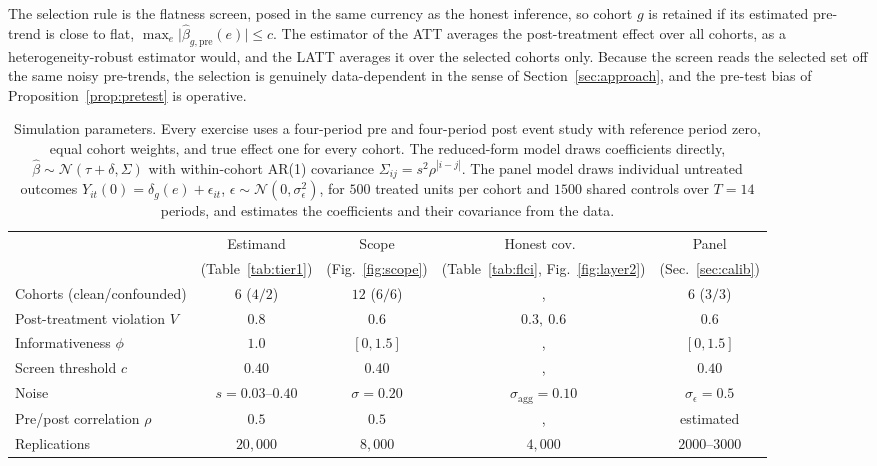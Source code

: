 \documentclass[12pt]{article}
\theoremstyle{remark}
\begin{document}
The selection rule is the flatness screen, posed in the same currency as the honest inference, so cohort
$g$ is retained if its estimated pre-trend is close to flat, $\max_e\lvert\hat\beta_{g,\mathrm{pre}}(e)\rvert\le c$.
The estimator of the ATT averages the post-treatment effect over all cohorts, as a heterogeneity-robust
estimator would, and the LATT averages it over the selected cohorts only. Because the screen reads the selected
set off the same noisy pre-trends, the selection is genuinely data-dependent
in the sense of Section~\ref{sec:approach}, and the pre-test bias of Proposition~\ref{prop:pretest} is
operative.

\begin{table}[t]
\centering
\caption{Simulation parameters. Every exercise uses a four-period pre and four-period post event study with
reference period zero, equal cohort weights, and true effect one for every cohort. The reduced-form model
draws coefficients directly, $\hat\beta\sim\mathcal{N}(\tau+\delta,\Sigma)$ with within-cohort AR(1)
covariance $\Sigma_{ij}=s^2\rho^{|i-j|}$. The panel model draws individual untreated outcomes
$Y_{it}(0)=\delta_g(e)+\epsilon_{it}$, $\epsilon\sim\mathcal{N}(0,\sigma_\epsilon^2)$, for $500$ treated
units per cohort and $1500$ shared controls over $T=14$ periods, and estimates the coefficients and their
covariance from the data.}
\label{tab:dgp}
\begin{tabular}{lcccc}
\toprule
& Estimand & Scope & Honest cov.\ & Panel \\
& (Table~\ref{tab:tier1}) & (Fig.~\ref{fig:scope}) & (Table~\ref{tab:flci}, Fig.~\ref{fig:layer2}) & (Sec.~\ref{sec:calib}) \\
\midrule
Cohorts (clean/confounded) & $6$ ($4/2$) & $12$ ($6/6$) &, & $6$ ($3/3$) \\
Post-treatment violation $V$ & $0.8$ & $0.6$ & $0.3,\ 0.6$ & $0.6$ \\
Informativeness $\phi$ & $1.0$ & $[0,1.5]$ &, & $[0,1.5]$ \\
Screen threshold $c$ & $0.40$ & $0.40$ &, & $0.40$ \\
Noise & $s{=}0.03\text{--}0.40$ & $\sigma{=}0.20$ & $\sigma_{\mathrm{agg}}{=}0.10$ & $\sigma_\epsilon{=}0.5$ \\
Pre/post correlation $\rho$ & $0.5$ & $0.5$ &, & estimated \\
Replications & $20{,}000$ & $8{,}000$ & $4{,}000$ & $2000\text{--}3000$ \\
\bottomrule
\end{tabular}
\end{table}
\end{document}
